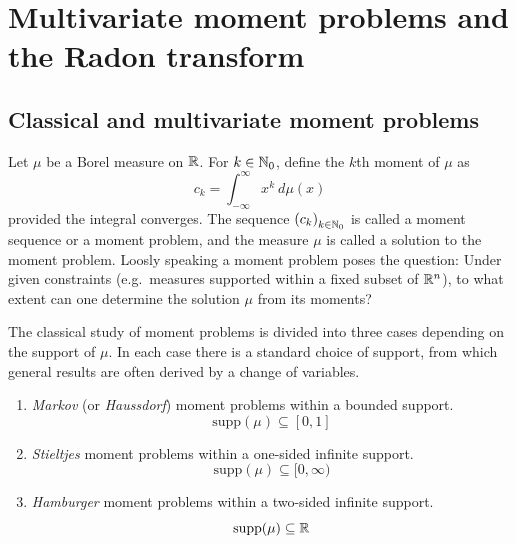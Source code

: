 

\chapter{Multivariate moment problems and the Radon transform}{}

\section{Classical and multivariate moment problems}
Let $\mu$ be a Borel measure on $\mathbb{R}$. For $k \in \mathbb{N}_0$, define the $k$th moment of $\mu$ as
\[
  c_k = \int_{-\infty}^\infty x^k ~d\mu(x)
\]
provided the integral converges. The sequence ${(c_k)}_{k \in \mathbb{N}_0}$ is called a moment sequence or a moment problem, and the measure $\mu$ is called a solution to the moment problem. Loosly speaking a moment problem poses the question: Under given constraints (e.g.\ measures supported within a fixed subset of $\mathbb{R}^n$), to what extent can one determine the solution $\mu$ from its moments?

The classical study of moment problems is divided into three cases depending on the support of $\mu$. In each case there is a standard choice of support, from which general results are often derived by a change of variables.
\begin{enumerate}[label=]
  \item \emph{Markov} (or \emph{Haussdorf}) moment problems within a bounded support.
  \[
    \text{supp}(\mu) \subseteq [0,1]
  \]
  \item \emph{Stieltjes} moment problems within a one-sided infinite support. 
  \[
    \text{supp}(\mu) \subseteq [0,\infty)
  \]
  \item \emph{Hamburger} moment problems within a two-sided infinite support.
  \[
    \text{supp}(\mu) \subseteq \mathbb{R}
  \]
\end{enumerate}

